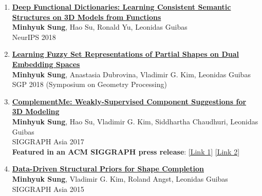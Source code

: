 \documentclass[letterpaper,10pt]{article} %
\newcommand{\blankline}{\quad\pagebreak[2]}
\begin{document}
{{\begin{enumerate}
\item \label{neurips18}
\href{https://arxiv.org/abs/1805.09957}{\textbf{Deep Functional Dictionaries: Learning Consistent Semantic Structures on 3D Models from Functions}}\\
\textbf{Minhyuk Sung}, Hao Su, Ronald Yu, Leonidas Guibas\\
NeurIPS 2018\\
\blankline

\item \label{sgp18}
\href{https://mhsung.github.io/fuzzy-set-dual}{\textbf{Learning Fuzzy Set Representations of Partial Shapes on Dual Embedding Spaces}}\\
\textbf{Minhyuk Sung}, Anastasia Dubrovina, Vladimir G. Kim, Leonidas Guibas\\
SGP 2018 (Symposium on Geometry Processing)\\
\blankline

\item \label{siggraphasia17}
\href{https://mhsung.github.io/complement-me.html}{\textbf{ComplementMe: Weakly-Supervised Component Suggestions for 3D Modeling}}\\
\textbf{Minhyuk Sung}, Hao Su, Vladimir G. Kim, Siddhartha Chaudhuri, Leonidas Guibas\\
SIGGRAPH Asia 2017\\
{\color{linkcolor}
\textbf{Featured in an ACM SIGGRAPH press release}:
\href{https://www.eurekalert.org/pub_releases/2017-11/afcm-sad120417.php}{[Link 1]}
\href{https://scienmag.com/simplifying-assembly-based-design-for-3-d-modeling/}{[Link 2]}
}\\
\blankline

\item \label{siggraphasia15}
\href{https://mhsung.github.io/structure-completion.html}{\textbf{Data-Driven Structural Priors for Shape Completion}}\\
\textbf{Minhyuk Sung}, Vladimir G. Kim, Roland Angst, Leonidas Guibas\\
SIGGRAPH Asia 2015\\
\blankline


\end{enumerate}}}
\end{document}
